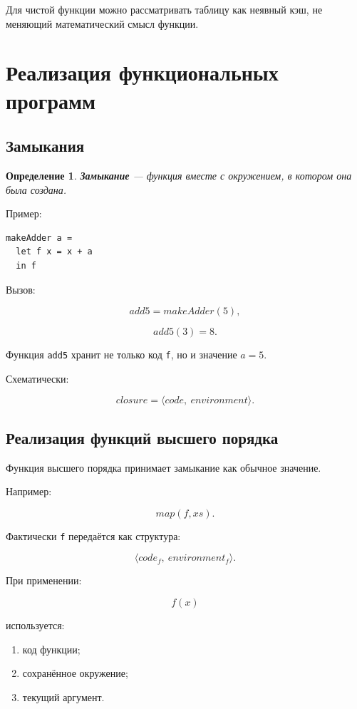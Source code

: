 \documentclass[12pt,a4paper]{article}
\newtheorem{definition}{Определение}
\begin{document}
Для чистой функции можно рассматривать таблицу как неявный кэш, не меняющий математический смысл функции.

\section{Реализация функциональных программ}

\subsection{Замыкания}

\begin{definition}
\textbf{Замыкание} --- функция вместе с окружением, в котором она была создана.
\end{definition}

Пример:

\begin{lstlisting}
makeAdder a =
  let f x = x + a
  in f
\end{lstlisting}

Вызов:

\[
add5 = makeAdder(5),
\]

\[
add5(3) = 8.
\]

Функция \texttt{add5} хранит не только код \texttt{f}, но и значение $a = 5$.

Схематически:

\[
closure = \langle code,\ environment \rangle.
\]

\subsection{Реализация функций высшего порядка}

Функция высшего порядка принимает замыкание как обычное значение.

Например:

\[
map(f, xs).
\]

Фактически \texttt{f} передаётся как структура:

\[
\langle code_f,\ environment_f \rangle.
\]

При применении:

\[
f(x)
\]

используется:
\begin{enumerate}
  \item код функции;
  \item сохранённое окружение;
  \item текущий аргумент.
\end{enumerate}
\end{document}
